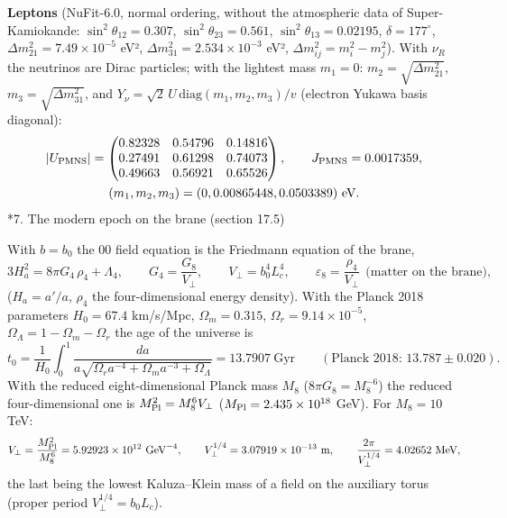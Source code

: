 \documentclass[10pt,a4paper]{article}
\makeatletter
\renewcommand\section{\@startsection{section}{1}{\z@}{-3.5ex \@plus -1ex \@minus -.2ex}{2.3ex \@plus.2ex}{\normalfont\Large\bfseries\raggedright}}
\makeatother
\begin{document}
\textbf{Leptons} (NuFit-6.0, normal ordering, without the atmospheric data of Super-Kamiokande: $\sin^2\theta_{12}=0.307$, $\sin^2\theta_{23}=0.561$, $\sin^2\theta_{13}=0.02195$, $\delta=177^\circ$, $\Delta m^2_{21}=7.49\times10^{-5}$ eV², $\Delta m^2_{31}=2.534\times10^{-3}$ eV², $\Delta m^2_{ij}=m_i^2-m_j^2$). With $\nu_R$ the neutrinos are Dirac particles; with the lightest mass $m_1=0$: $m_2=\sqrt{\Delta m^2_{21}}$, $m_3=\sqrt{\Delta m^2_{31}}$, and $Y_\nu=\sqrt2\,U\,\mathrm{diag}(m_1,m_2,m_3)/v$ (electron Yukawa basis diagonal):
\begin{gather*}
|U_{\rm PMNS}|=\begin{pmatrix}0.82328&0.54796&0.14816\\0.27491&0.61298&0.74073\\0.49663&0.56921&0.65526\end{pmatrix},\qquad J_{\rm PMNS}=0.0017359,\\ (m_1,m_2,m_3)=(0, 0.00865448, 0.0503389)\ \text{eV}.
\end{gather*}
\section*{7. The modern epoch on the brane (section 17.5)}
With $b=b_0$ the 00 field equation is the Friedmann equation of the brane,
\begin{equation*}
3H_a^2=8\pi G_4\,\rho_4+\Lambda_4,\qquad G_4=\frac{G_8}{V_\perp},\qquad V_\perp=b_0^4L_c^4,\qquad \varepsilon_8=\frac{\rho_4}{V_\perp}\ \ \text{(matter on the brane)},
\end{equation*}
($H_a=a'/a$, $\rho_4$ the four-dimensional energy density). With the Planck 2018 parameters $H_0=67.4$ km/s/Mpc, $\Omega_m=0.315$, $\Omega_r=9.14\times10^{-5}$, $\Omega_\Lambda=1-\Omega_m-\Omega_r$ the age of the universe is
\begin{equation*}
t_0=\frac1{H_0}\int_0^1\frac{da}{a\sqrt{\Omega_r a^{-4}+\Omega_m a^{-3}+\Omega_\Lambda}}=13.7907\ \text{Gyr}\qquad(\text{Planck 2018: }13.787\pm0.020).
\end{equation*}
With the reduced eight-dimensional Planck mass $M_8$ ($8\pi G_8=M_8^{-6}$) the reduced four-dimensional one is $M_{\rm Pl}^2=M_8^6V_\perp$ ($M_{\rm Pl}=2.435\times10^{18}$ GeV). For $M_8=10$ TeV:
\begin{equation*}
V_\perp=\frac{M_{\rm Pl}^2}{M_8^6}=5.92923\times10^{12}\ \text{GeV}^{-4},\qquad V_\perp^{1/4}=3.07919\times10^{-13}\ \text{m},\qquad \frac{2\pi}{V_\perp^{1/4}}=4.02652\ \text{MeV},
\end{equation*}
the last being the lowest Kaluza–Klein mass of a field on the auxiliary torus (proper period $V_\perp^{1/4}=b_0L_c$).
\end{document}
